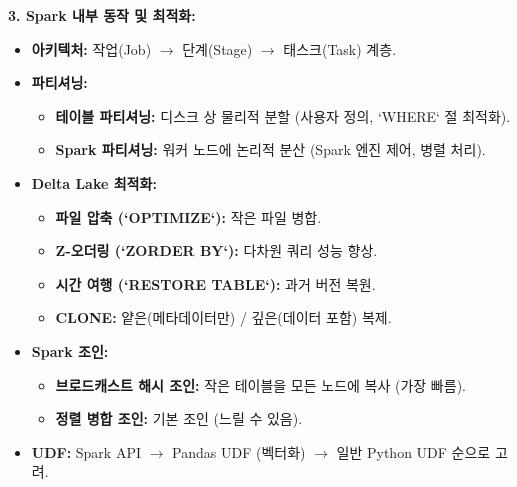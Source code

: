 \documentclass[11pt,a4paper]{article}
\begin{document}
\begin{tcolorbox}[colback=blue!5!white, colframe=blue!75!black, title=\textbf{CSCI103 Lecture 4: 데이터 변환 핵심 요약}]
\textbf{3. Spark 내부 동작 및 최적화:}
\begin{itemize}
    \item \textbf{아키텍처:} 작업(Job) $\rightarrow$ 단계(Stage) $\rightarrow$ 태스크(Task) 계층.
    \item \textbf{파티셔닝:}
    \begin{itemize}
        \item \textbf{테이블 파티셔닝:} 디스크 상 물리적 분할 (사용자 정의, `WHERE` 절 최적화).
        \item \textbf{Spark 파티셔닝:} 워커 노드에 논리적 분산 (Spark 엔진 제어, 병렬 처리).
    \end{itemize}
    \item \textbf{Delta Lake 최적화:}
    \begin{itemize}
        \item \textbf{파일 압축 (`OPTIMIZE`):} 작은 파일 병합.
        \item \textbf{Z-오더링 (`ZORDER BY`):} 다차원 쿼리 성능 향상.
        \item \textbf{시간 여행 (`RESTORE TABLE`):} 과거 버전 복원.
        \item \textbf{CLONE:} 얕은(메타데이터만) / 깊은(데이터 포함) 복제.
    \end{itemize}
    \item \textbf{Spark 조인:}
    \begin{itemize}
        \item \textbf{브로드캐스트 해시 조인:} 작은 테이블을 모든 노드에 복사 (가장 빠름).
        \item \textbf{정렬 병합 조인:} 기본 조인 (느릴 수 있음).
    \end{itemize}
    \item \textbf{UDF:} Spark API $\rightarrow$ Pandas UDF (벡터화) $\rightarrow$ 일반 Python UDF 순으로 고려.
\end{itemize}


\end{tcolorbox}
\end{document}

